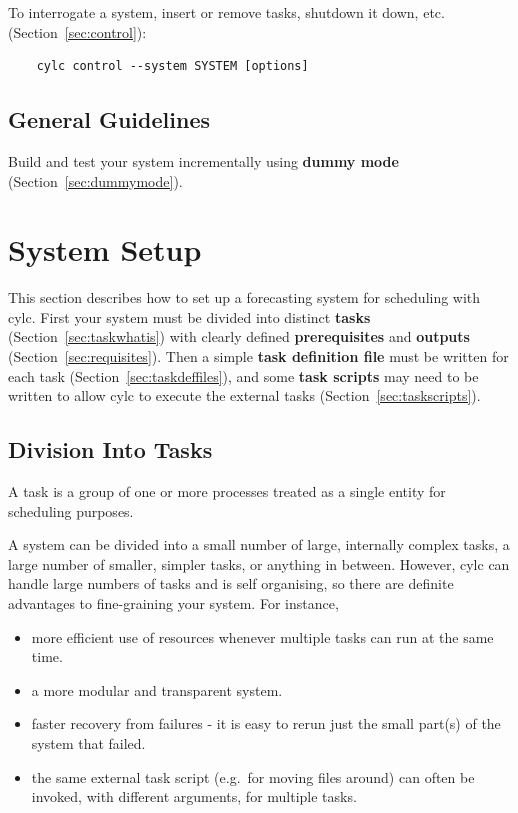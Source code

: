 \documentclass[11pt,a4paper]{article}
\begin{document}
To interrogate a system, insert or remove tasks, shutdown it down, etc.
(Section~\ref{sec:control}):

\begin{lstlisting}
    cylc control --system SYSTEM [options]
\end{lstlisting}


\subsection{General Guidelines}

Build and test your system incrementally using {\bf dummy mode}
(Section~\ref{sec:dummymode}).


\pagebreak
\label{sec:tasks}
\section{System Setup}

This section describes how to set up a forecasting system for scheduling
with cylc. First your system must be divided into distinct {\bf tasks}
(Section~\ref{sec:taskwhatis}) with clearly defined {\bf prerequisites} and
{\bf outputs} (Section~\ref{sec:requisites}). Then a simple {\bf task
definition file} must be written for each task
(Section~\ref{sec:taskdeffiles}), and some {\bf task scripts} may need
to be written to allow cylc to execute the external tasks
(Section~\ref{sec:taskscripts}).

\label{sec:divisionintotasks}
\subsection{Division Into Tasks}

\begin{shaded}
A task is a group of one or more processes treated as a single entity
for scheduling purposes.
\end{shaded}

A system can be divided into a small number of large, internally
complex tasks, a large number of smaller, simpler tasks, or anything
in between. However, cylc can handle large numbers of tasks and is self
organising, so there are definite advantages to fine-graining your
system. For instance,

\begin{itemize}
    \item more efficient use of resources whenever multiple tasks can
        run at the same time.
    \item a more modular and transparent system.
    \item faster recovery from failures - it is easy to rerun just the
        small part(s) of the system that failed. 
    \item the same external task script (e.g.\ for moving files around)
        can often be invoked, with different arguments, for multiple tasks.
\end{itemize}
\end{document}

